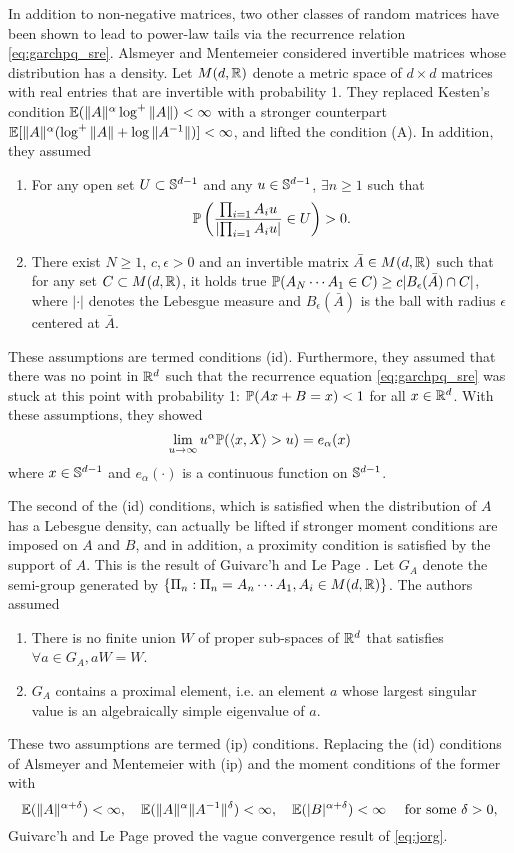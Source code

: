 In addition to non-negative matrices, two other classes of random
matrices have been shown to lead to power-law tails via the recurrence
relation \eqref{eq:garchpq_sre}. Alsmeyer and Mentemeier
\cite{alsmeyer:mentemeier:2012} considered invertible matrices whose
distribution has a density. Let $M(d, \reals)$ denote a metric space of
$d \times d$ matrices with real entries that are invertible with
probability 1. They replaced Kesten's condition
$\E (\|A\|^\alpha \log^+\|A\|) < \infty$ with a stronger
counterpart
$\E [\|A\|^\alpha (\log^+\|A\| + \log \|A^{-1} \|)] < \infty$,
and lifted the condition (A). In addition, they assumed
\begin{enumerate}
  \item For any open set $U \subset \sphere^{d-1}$ and any
    $u \in \sphere^{d-1}$,  $\exists n \geq 1$ such that
    \[
    \P\left({\prod_{i=1} A_i u
        \over
        \left|\prod_{i=1} A_i u\right|}\in U
    \right) > 0.
    \]
  \item There exist $N \geq 1$, $c, \epsilon > 0$ and an invertible
    matrix $\bar A \in M(d, \reals)$ such that for any set
    $C \subset M(d, \reals)$, it holds true
    $\P(A_N \cdots A_1 \in C) \geq c |B_\epsilon(\bar A) \cap C|$,
    where $|\cdot|$ denotes the Lebesgue measure and
    $B_\epsilon(\bar A)$ is the ball with radius $\epsilon$ centered
    at $\bar A$.
\end{enumerate}
These assumptions are termed conditions (id). Furthermore, they assumed
that there was no point in $\reals^d$ such that the recurrence
equation \eqref{eq:garchpq_sre} was stuck at this point with probability 1: 
$\P(A x + B = x) < 1$ for all $x \in \reals^d$. With these
assumptions, they showed
\[
\lim_{u \to \infty} u^\alpha \P(\inn{x, X} > u) = e_\alpha(x)
\]
where $x \in \sphere^{d - 1}$ and $e_\alpha(\cdot)$ is a continuous
function on $\sphere^{d-1}$.

The second of the (id) conditions, which is satisfied when the
distribution of $A$ has a Lebesgue density, can actually be lifted if
stronger moment conditions are imposed on $A$ and $B$, and in
addition, a proximity condition is satisfied by the support of
$A$. This is the result of Guivarc'h and Le Page
\cite{guivarc:page:2016}. Let $G_A$ denote the semi-group generated
by $\{\Pi_n: \Pi_n = A_n \cdots A_1, A_i \in M(d, \reals)\}$. The
authors assumed
\begin{enumerate}
  \item There is no finite union $W$ of proper sub-spaces of $\reals^d$
    that satisfies $\forall a \in G_A, a W = W$.
  \item $G_A$ contains a proximal element, i.e. an element $a$ whose
    largest singular value is an algebraically simple eigenvalue of $a$.
\end{enumerate}
These two assumptions are termed (ip) conditions. Replacing the (id)
conditions of Alsmeyer and Mentemeier with (ip) and the moment
conditions of the former with
\[
\E (\|A\|^{\alpha + \delta}) < \infty, \quad
\E (\|A\|^{\alpha} \|A^{-1}\|^{\delta}) < \infty, \quad
\E (|B|^{\alpha + \delta}) < \infty \quad
\text{ for some }\delta > 0,
\]
Guivarc'h and Le Page proved the vague convergence result of
\eqref{eq:jorg}.

